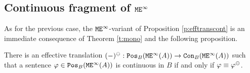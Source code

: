 

\subsection{Continuous fragment of $\ofoei$}

As for the previous case, the $\ofoei$-variant of
Proposition \ref{p:efftranscont} is an immediate consequence of 
Theorem \ref{t:mono} and the following proposition.

\begin{proposition}\label{lem:ofoeictrans}
There is an effective translation $(-)^\tcont:\monot{\ofoei(A)}{B} \to 
\cont{\ofoei(A)}{B}$ such that a sentence $\phi \in \monot{\ofoei(A)}{B}$ is 
continuous in $B$ if and only if $\phi\equiv \phi^\tcont$.
\end{proposition}

